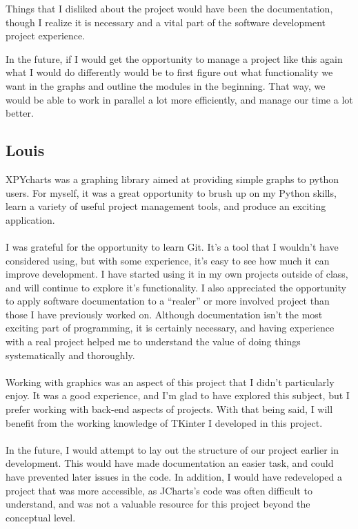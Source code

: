 \documentclass{article}
\begin{document}
Things that I disliked about the project would have been the documentation, though I realize it is necessary and a vital part of the software development project experience. 

In the future, if I would get the opportunity to manage a project like this again what I would do differently would be to first figure out what functionality we want in the graphs and outline the modules in the beginning. That way, we would be able to work in parallel a lot more efficiently, and manage our time a lot better. 
\subsection{Louis}
XPYcharts was a graphing library aimed at providing simple graphs to python users. For myself, it was a great opportunity to brush up on my Python skills, learn a variety of useful project management tools, and produce an exciting application.\\\\
I was grateful for the opportunity to learn Git. It's a tool that I wouldn't have considered using, but with some experience, it's easy to see how much it can improve development. I have started using it in my own projects outside of class, and will continue to explore it's functionality. I also appreciated the opportunity to apply software documentation to a ``realer'' or more involved project than those I have previously worked on. Although documentation isn't the most exciting part of programming, it is certainly necessary, and having experience with a real project helped me to understand the value of doing things systematically and thoroughly.\\\\
Working with graphics was an aspect of this project that I didn't particularly enjoy. It was a good experience, and I'm glad to have explored this subject, but I prefer working with back-end aspects of projects. With that being said, I will benefit from the working knowledge of TKinter I developed in this project.\\\\
In the future, I would attempt to lay out the structure of our project earlier in development. This would have made documentation an easier task, and could have prevented later issues in the code. In addition, I would have redeveloped a project that was more accessible, as JCharts's code was often difficult to understand, and was not a valuable resource for this project beyond the conceptual level.
\end{document}
